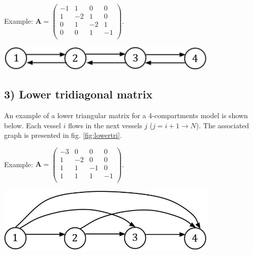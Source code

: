 \begin{minipage}[l]{0.5\linewidth}
	Example: $
	\mathbf{A}=\begin{pmatrix}
	-1 & 1 & 0 & 0\\
	1 & -2 & 1 & 0\\
	0 & 1 & -2 & 1\\
	0 & 0 & 1 & -1\\
	\end{pmatrix}$.
\end{minipage}
\begin{minipage}[r]{0.5\textwidth}
	\centering
	\includegraphics[width=0.8\textwidth]{tridiag}
	\label{fig:tridiagonal}
\end{minipage}

\subsection*{3) Lower tridiagonal matrix}
An example of a lower triangular matrix for a 4-compartments model is shown below. Each vessel $i$ flows in the next vessels $j$ ($j=i+1\rightarrow N$). The associated graph is presented in fig. \ref{fig:lowertri}.\\

\begin{minipage}[l]{0.5\linewidth}
	Example: $
	\mathbf{A}=\begin{pmatrix}
	-3 & 0 & 0 & 0\\
	1 & -2 & 0 & 0\\
	1 & 1 & -1 & 0\\
	1 & 1 & 1 & -1\\
	\end{pmatrix}$.
\end{minipage}
\begin{minipage}[r]{0.5\textwidth}
	\centering
	\includegraphics[width=0.8\textwidth]{lowertri}
	\label{fig:lowertri}
\end{minipage}

